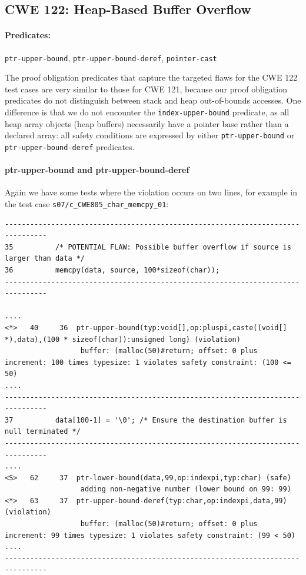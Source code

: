 \documentclass[11pt]{article}
\begin{document}
\subsection{CWE 122: Heap-Based Buffer Overflow}

\paragraph{Predicates:} {\tt ptr-upper-bound}, {\tt ptr-upper-bound-deref},
{\tt pointer-cast}

The proof obligation predicates that capture the targeted flaws for the 
CWE 122 test cases are very similar to those for CWE 121, because our
proof obligation predicates do not distinguish between stack and heap
out-of-bounds accesses. One difference is that we do not encounter the
{\tt index-upper-bound} predicate, as all heap array objects (heap buffers)
necessarily have a pointer base rather than a declared array: all safety
conditions are expressed by either {\tt ptr-upper-bound} or 
{\tt ptr-upper-bound-deref} predicates. 


\paragraph{ptr-upper-bound and ptr-upper-bound-deref}
Again we have some tests where the violation occurs on two lines, for example
in the test case {\tt  s07/c\_CWE805\_char\_memcpy\_01}:
\begin{tiny}
\begin{verbatim}
--------------------------------------------------------------------------------
35          /* POTENTIAL FLAW: Possible buffer overflow if source is larger than data */
36          memcpy(data, source, 100*sizeof(char));
--------------------------------------------------------------------------------

.... 
<*>   40     36  ptr-upper-bound(typ:void[],op:pluspi,caste((void[] *),data),(100 * sizeof(char)):unsigned long) (violation)
                  buffer: (malloc(50)#return; offset: 0 plus increment: 100 times typesize: 1 violates safety constraint: (100 <= 50)
....
--------------------------------------------------------------------------------
37          data[100-1] = '\0'; /* Ensure the destination buffer is null terminated */
--------------------------------------------------------------------------------
....
<S>   62     37  ptr-lower-bound(data,99,op:indexpi,typ:char) (safe)
                  adding non-negative number (lower bound on 99: 99)
<*>   63     37  ptr-upper-bound-deref(typ:char,op:indexpi,data,99) (violation)
                  buffer: (malloc(50)#return; offset: 0 plus increment: 99 times typesize: 1 violates safety constraint: (99 < 50)
....
--------------------------------------------------------------------------------                
\end{verbatim}
\end{tiny}
\end{document}

